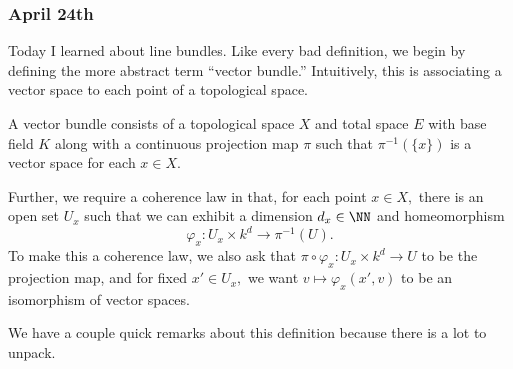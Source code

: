 \subsubsection{April 24th}
Today I learned about line bundles. Like every bad definition, we begin by defining the more abstract term ``vector bundle.'' Intuitively, this is associating a vector space to each point of a topological space.
\begin{definition}
    A vector bundle consists of a topological space $X$ and total space $E$ with base field $K$ along with a continuous projection map $\pi$ such that $\pi^{-1}(\{x\})$ is a vector space for each $x\in X.$
    
    Further, we require a coherence law in that, for each point $x\in X,$ there is an open set $U_x$ such that we can exhibit a dimension $d_x\in\NN$ and homeomorphism
    \[\varphi_x:U_x\times k^d\to\pi^{-1}(U).\]
    To make this a coherence law, we also ask that $\pi\circ\varphi_x:U_x\times k^d\to U$ to be the projection map, and for fixed $x'\in U_x,$ we want $v\mapsto\varphi_x(x',v)$ to be an isomorphism of vector spaces.
\end{definition}
We have a couple quick remarks about this definition because there is a lot to unpack.
